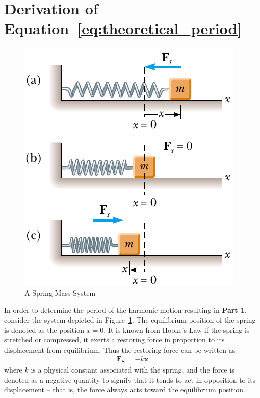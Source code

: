 \documentclass[twocolumn,english]{IEEEtran}
\theoremstyle{plain}
\theoremstyle{plain}
\begin{document}
\section{Derivation of Equation~\ref{eq:theoretical_period}}\label{append:period_deriv}

\begin{figure}[h!]
  \begin{centering}
  \begin{center}
  \includegraphics[width=\linewidth]{./simple_pendulum.png}
  \caption{A Spring-Mass System}
  \label{fig:spring_mass}
  \end{center}
  \par\end{centering}
  \end{figure}

  In order to determine the period of the harmonic motion resulting in
  \textbf{Part 1}, consider the system depicted in Figure~\ref{fig:spring_mass}.
  The equilibrium position of the spring is denoted as the position $x=0$. It is known from Hooke's Law if the spring is stretched or compressed, it exerts a restoring force in proportion to its displacement from equilibrium. Thus the restoring force can be written as
  \begin{align*}
   \mathbf{F_S} = -k\mathbf{x}
  \end{align*}
  where $k$ is a physical constant associated with the spring, and the force is denoted as a negative quantity to signify that it tends to act in opposition to its displacement -- that is, the force always acts toward the equilibrium position.
\end{document}
